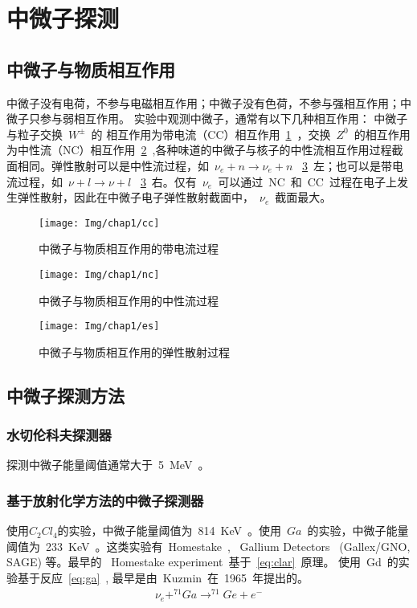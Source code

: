 \section{中微子探测}
\subsection{中微子与物质相互作用}
中微子没有电荷，不参与电磁相互作用；中微子没有色荷，不参与强相互作用；中微子只参与弱相互作用。
实验中观测中微子，通常有以下几种相互作用：
中微子与粒子交换~$W^{\pm}$~的
相互作用为带电流（CC）相互作用~\ref{fig:cc}~，交换~$Z^0$~的相互作用为中性流（NC）相互作用~\ref{fig:nc}~,各种味道的中微子与核子的中性流相互作用过程截面相同。弹性散射可以是中性流过程，如~$\nu_e+n \rightarrow \nu_e+n $ ~\ref{fig:es}~左；也可以是带电流过程，如~$\nu+l \rightarrow
\nu+l$ ~\ref{fig:es}~右。仅有~$\nu_e$~可以通过~NC~和~CC~过程在电子上发生弹性散射，因此在中微子电子弹性散射截面中，~$\nu_e$~截面最大。
\begin{figure}[!htbp]
  \centering
   \texttt{[image: Img/chap1/cc]}
    \caption{ 中微子与物质相互作用的带电流过程}
  \label{fig:cc}
\end{figure}
\begin{figure}[!htbp]
  \centering
   \texttt{[image: Img/chap1/nc]}
    \caption{ 中微子与物质相互作用的中性流过程}
  \label{fig:nc}
\end{figure}
\begin{figure}[!htbp]
  \centering
   \texttt{[image: Img/chap1/es]}
    \caption{ 中微子与物质相互作用的弹性散射过程}
  \label{fig:es}
\end{figure}

\subsection{中微子探测方法}
\subsubsection{水切伦科夫探测器}
探测中微子能量阈值通常大于~5~MeV~。
\subsubsection{基于放射化学方法的中微子探测器}
使用$C_2 Cl_4$的实验，中微子能量阈值为~814~KeV~。使用~$Ga$~的实验，中微子能量阈值为~233~KeV~。这类实验有~Homestake~, ~Gallium Detectors~
(Gallex/GNO, SAGE) 等。最早的 ~Homestake experiment~基于~\ref{eq:clar}~原理。
使用~Gd~的实验基于反应~\ref{eq:ga}~, 最早是由~Kuzmin~在~1965~年提出的。
\begin{eqnarray}\label{ga}
\nu_e + ^{71}Ga \rightarrow ^{71}Ge + e^-
\end{eqnarray}
